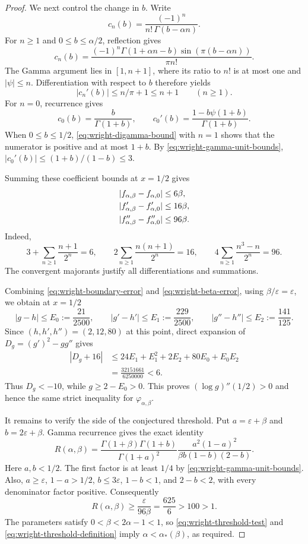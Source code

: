 \documentclass[11pt,a4paper]{article}
\theoremstyle{definition}
\theoremstyle{remark}
\numberwithin{equation}{section}
\begin{document}
\begin{proof}
We next control the change in $b$. Write
\[
 c_n(b)=\frac{(-1)^n}{n!\,\Gamma(b-\alpha n)}.
\]
For $n\geq1$ and $0\leq b\leq\alpha/2$, reflection gives
\[
 c_n(b)=\frac{(-1)^n\Gamma(1+\alpha n-b)
                     \sin(\pi(b-\alpha n))}{\pi n!}.
\]
The Gamma argument lies in $[1,n+1]$, where its ratio to $n!$ is at
most one and $|\psi|\leq n$. Differentiation with respect to $b$
therefore yields
\begin{equation}
 |c_n'(b)|\leq n/\pi+1\leq n+1\qquad(n\geq1).
 \label{eq:wright-beta-coefficients}
\end{equation}
For $n=0$, recurrence gives
\[
 c_0(b)=\frac{b}{\Gamma(1+b)},\qquad
 c_0'(b)=\frac{1-b\psi(1+b)}{\Gamma(1+b)}.
\]
When $0\leq b\leq1/2$, \eqref{eq:wright-digamma-bound} with $n=1$
shows that the numerator is positive and at most $1+b$.
By \eqref{eq:wright-gamma-unit-bounds},
$|c_0'(b)|\leq(1+b)/(1-b)\leq3$.

Summing these coefficient bounds at $x=1/2$ gives
\begin{align}
 |f_{\alpha,\beta}-f_{\alpha,0}|&\leq6\beta,\notag\\
 |f_{\alpha,\beta}'-f_{\alpha,0}'|&\leq16\beta,\notag\\
 |f_{\alpha,\beta}''-f_{\alpha,0}''|&\leq96\beta.
 \label{eq:wright-beta-error}
\end{align}
Indeed,
\[
 3+\sum_{n\geq1}\frac{n+1}{2^n}=6,\qquad
 2\sum_{n\geq1}\frac{n(n+1)}{2^n}=16,\qquad
 4\sum_{n\geq1}\frac{n^3-n}{2^n}=96.
\]
The convergent majorants justify all differentiations and summations.

Combining \eqref{eq:wright-boundary-error} and
\eqref{eq:wright-beta-error}, using $\beta/\varepsilon=\varepsilon$,
we obtain at $x=1/2$
\[
 |g-h|\leq E_0:=\frac{21}{2500},\qquad
 |g'-h'|\leq E_1:=\frac{229}{2500},\qquad
 |g''-h''|\leq E_2:=\frac{141}{125}.
\]
Since $(h,h',h'')=(2,12,80)$ at this point, direct expansion of
$D_g=(g')^2-gg''$ gives
\begin{align*}
 |D_g+16|
 &\leq24E_1+E_1^2+2E_2+80E_0+E_0E_2\\
 &=\frac{32151661}{6250000}<6.
\end{align*}
Thus $D_g<-10$, while $g\geq2-E_0>0$. This proves
$(\log g)''(1/2)>0$ and hence the same strict inequality for
$\varphi_{\alpha,\beta}$.

It remains to verify the side of the conjectured threshold. Put
$a=\varepsilon+\beta$ and $b=2\varepsilon+\beta$. Gamma recurrence
gives the exact identity
\begin{equation}
 R(\alpha,\beta)
 =\frac{\Gamma(1+\beta)\Gamma(1+b)}{\Gamma(1+a)^2}
   \frac{a^2(1-a)^2}{\beta b(1-b)(2-b)}.
 \label{eq:wright-positive-ratio}
\end{equation}
Here $a,b<1/2$. The first factor is at least $1/4$ by
\eqref{eq:wright-gamma-unit-bounds}. Also,
$a\geq\varepsilon$, $1-a>1/2$, $b\leq3\varepsilon$,
$1-b<1$, and $2-b<2$, with every denominator factor positive.
Consequently
\[
 R(\alpha,\beta)\geq\frac{\varepsilon}{96\beta}
 =\frac{625}{6}>100>1.
\]
The parameters satisfy $0<\beta<2\alpha-1<1$, so
\eqref{eq:wright-threshold-test} and
\eqref{eq:wright-threshold-definition} imply
$\alpha<\alpha_*(\beta)$, as required.
\end{proof}
\end{document}
